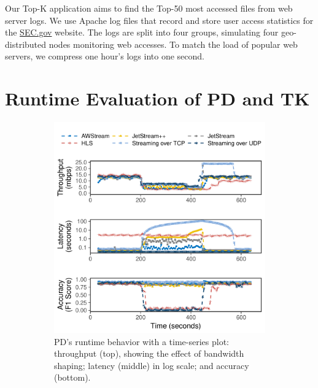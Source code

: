 \documentclass[twocolumn, 9pt]{article}
\begin{document}
Our Top-K application aims to find the Top-50 most accessed files from web
server logs. We use Apache log files that record and store user access
statistics for the \href{https://www.sec.gov}{SEC.gov} website. The logs are
split into four groups, simulating four geo-distributed nodes monitoring web
accesses. To match the load of popular web servers, we compress one hour's logs
into one second.

\section{Runtime Evaluation of PD and TK}
\label{appendix:more-runtime}

\begin{figure}[t]
  \begin{subfigure}[t]{\columnwidth}
    \centering
    \includegraphics[width=\columnwidth]{figures/runtime_mot-timeseries.pdf}
    \caption{PD's runtime behavior with a time-series plot: throughput (top),
      showing the effect of bandwidth shaping; latency (middle) in log scale;
      and accuracy (bottom).}
    \label{fig:pd-runtime-timeseries}
  \end{subfigure}
  \vspace{1em}
  \\
  \begin{subfigure}[t]{\columnwidth}

\end{subfigure}
\end{figure}
\end{document}
